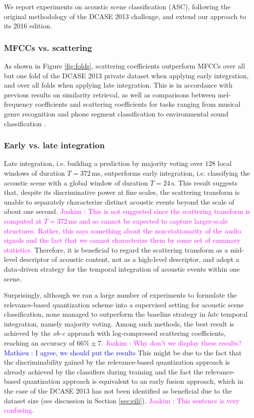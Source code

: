 \documentclass[journal]{IEEEtran}
\makeatletter
\newcommand*{\ie}{i.e.\@\xspace}
\newcommand*{\vs}{vs.\@\xspace}
\newcommand{\ja}[1]{\textcolor{magenta}{Joakim : #1}}
\newcommand{\ml}[1]{\textcolor{blue}{ Mathieu : #1}}
\makeatother
\begin{document}
We report experiments on acoustic scene classification (ASC), following the original methodology of the DCASE 2013 challenge, and extend our approach to its 2016 edition.

\subsubsection*{MFCCs \vs scattering}

As shown in Figure \ref{fig:folds}, scattering coefficients outperform MFCCs over all but one fold of the DCASE 2013 private dataset when applying early integration, and over all folds when applying late integration.
This is in accordance with previous results on similarity retrieval, as well as comparisons between mel-frequency coefficients and scattering coefficients for tasks ranging from musical genre recognition and phone segment classification \cite{Anden2014} to environmental sound classification \cite{Salamon2015}.

\subsubsection*{Early \vs late integration}
Late integration, \ie building a prediction by majority voting over $128$ local windows of duration $T=372\,\mathrm{ms}$, outperforms early integration, \ie classifying the acoustic scene with a global window of duration $T=24\,\mathrm{s}$.
This result suggests that, despite its discriminative power at fine scales, the scattering transform is unable to separately characterize distinct acoustic events beyond the scale of about one second. \ja{This is not suggested since the scattering transform is computed at $T=372\,\mathrm{ms}$ and so cannot be expected to capture larger-scale structures. Rather, this says something about the non-stationarity of the audio signals and the fact that we cannot characterize them by some set of summary statistics.}
Therefore, it is beneficial to regard the scattering transform as a mid-level descriptor of acoustic content, not as a high-level descriptor, and adopt a data-driven strategy for the temporal integration of acoustic events within one scene.

Surprisingly, although we ran a large number of experiments to formulate the relevance-based quantization scheme into a supervised setting for acoustic scene classification, none managed to outperform the baseline strategy in \emph{late} temporal integration, namely majority voting. Among such methods, the best result is achieved by the \emph{ob-c} approach with log-compressed scattering coefficients, reaching an accuracy of $66\% \pm 7$. \ja{Why don't we display these results?} \ml{I agree, we should put the results} This might be due to the fact that the discriminability gained by the relevance-based quantization approach is already achieved by the classifiers during training and the fact the relevance-based quantization approach is equivalent to an early fusion approach, which in the case of the DCASE 2013 has not been identified as beneficial due to the dataset size (see discussion in Section \ref{sec:eili}). \ja{This sentence is very confusing.}
\end{document}
